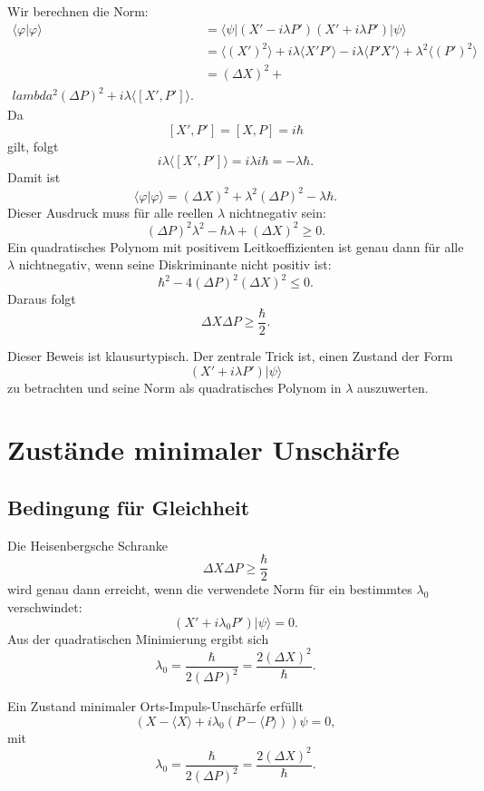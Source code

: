 \begin{derivationbox}
Wir berechnen die Norm:
\[
\begin{aligned}
    \langle\varphi|\varphi\rangle
    &=\langle\psi|(X'-i\lambda P')(X'+i\lambda P')|\psi\rangle \\
    &=\langle (X')^2\rangle
      +i\lambda\langle X'P'\rangle
      -i\lambda\langle P'X'\rangle
      +\lambda^2\langle (P')^2\rangle \\
    &=(\Delta X)^2+\\lambda^2(\Delta P)^2+i\lambda\langle[X',P']\rangle.
\end{aligned}
\]
Da
\[
    [X',P']=[X,P]=i\hbar
\]
gilt, folgt
\[
    i\lambda\langle[X',P']\rangle
    =i\lambda i\hbar
    =-\lambda\hbar.
\]
Damit ist
\[
    \langle\varphi|\varphi\rangle
    =(\Delta X)^2+\lambda^2(\Delta P)^2-\lambda\hbar.
\]
Dieser Ausdruck muss für alle reellen $\lambda$ nichtnegativ sein:
\[
    (\Delta P)^2\lambda^2-\hbar\lambda+(\Delta X)^2\ge0.
\]
Ein quadratisches Polynom mit positivem Leitkoeffizienten ist genau dann für alle $\lambda$ nichtnegativ, wenn seine Diskriminante nicht positiv ist:
\[
    \hbar^2-4(\Delta P)^2(\Delta X)^2\le0.
\]
Daraus folgt
\[
    \Delta X\Delta P\ge\frac{\hbar}{2}.
\]
\end{derivationbox}

\begin{examtipbox}
Dieser Beweis ist klausurtypisch. Der zentrale Trick ist, einen Zustand der Form
\[
    (X'+i\lambda P')|\psi\rangle
\]
zu betrachten und seine Norm als quadratisches Polynom in $\lambda$ auszuwerten.
\end{examtipbox}

\section{Zustände minimaler Unschärfe}

\subsection{Bedingung für Gleichheit}

Die Heisenbergsche Schranke
\[
    \Delta X\Delta P\ge\frac{\hbar}{2}
\]
wird genau dann erreicht, wenn die verwendete Norm für ein bestimmtes $\lambda_0$ verschwindet:
\[
    (X'+i\lambda_0P')|\psi\rangle=0.
\]
Aus der quadratischen Minimierung ergibt sich
\[
    \lambda_0=\frac{\hbar}{2(\Delta P)^2}
    =\frac{2(\Delta X)^2}{\hbar}.
\]

\begin{formulabox}
Ein Zustand minimaler Orts-Impuls-Unschärfe erfüllt
\[
    (X-\langle X\rangle+i\lambda_0(P-\langle P\rangle))\psi=0,
\]
mit
\[
    \lambda_0=\frac{\hbar}{2(\Delta P)^2}
    =\frac{2(\Delta X)^2}{\hbar}.
\]
\end{formulabox}

